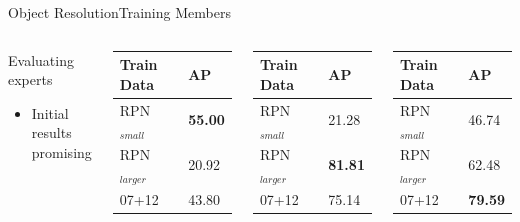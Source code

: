\begin{frame}{Object Resolution}{Training Members}
\begin{columns}
      \begin{block}{Evaluating experts}
        \begin{itemize}
            \item Initial results promising
        \end{itemize}
    \end{block}
       

        
        \begin{table}[h]
        \centering
        \begin{tabular}{|l|l|}
        \hline
        \textbf{Train Data} & \textbf{AP}      \\ \hline
        RPN$_{small}$      & \textbf{55.00} \\ \hline
        RPN$_{larger}$      & 20.92 \\ \hline
        07+12        & 43.80 \\ \hline
        \end{tabular}
        \end{table}

        \begin{table}[h]
        \centering
        \begin{tabular}{|l|l|}
        \hline
        \textbf{Train Data} & \textbf{AP}      \\ \hline
        RPN$_{small}$      & 21.28 \\ \hline
        RPN$_{larger}$      & \textbf{81.81} \\ \hline
        07+12        & 75.14 \\ \hline
        \end{tabular}
        \end{table}


        \begin{table}[h]
        \centering
        \begin{tabular}{|l|l|}
        \hline
        \textbf{Train Data} & \textbf{AP}      \\ \hline
        RPN$_{small}$      & 46.74 \\ \hline
        RPN$_{larger}$      & 62.48 \\ \hline
        07+12        & \textbf{79.59} \\ \hline
        \end{tabular}
        \end{table}


      
    \end{columns}
\end{frame}

